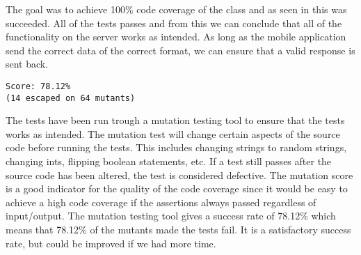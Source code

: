 The goal was to achieve 100\% code coverage of the  class and as seen in  this was succeeded. All of the tests passes and from this we can conclude that all of the functionality on the server works as intended. As long as the mobile application send the correct data of the correct format, we can ensure that a valid response is sent back.

\begin{lstlisting}[numbers=none, basicstyle=\ttfamily, caption={The result of the Mutagenesis test}]
Score: 78.12%
(14 escaped on 64 mutants)
\end{lstlisting}

The tests have been run trough a mutation testing tool\cite{mutagenesis} to ensure that the tests works as intended. The mutation test will change certain aspects of the source code before running the tests. This includes changing strings to random strings, changing ints, flipping boolean statements, etc. If a test still passes after the source code has been altered, the test is considered defective. The mutation score is a good indicator for the quality of the code coverage since it would be easy to achieve a high code coverage if the assertions always passed regardless of input/output. The mutation testing tool gives a success rate of 78.12\% which means that 78.12\% of the mutants made the tests fail. It is a satisfactory success rate, but could be improved if we had more time.

